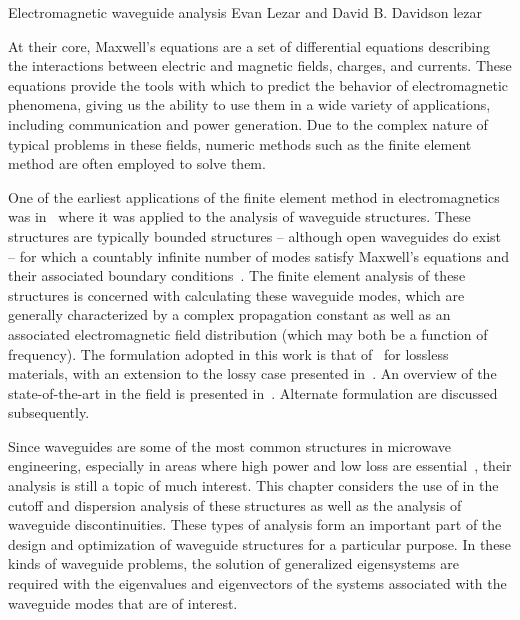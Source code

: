               {Electromagnetic waveguide analysis}
              {Evan Lezar and David B. Davidson}
              {lezar}


At their core, Maxwell's equations are a
set of differential equations describing the interactions between
electric and magnetic fields, charges, and currents. These equations
provide the tools with which to predict the behavior of
electromagnetic phenomena, giving us the
ability to use them in a wide variety of applications, including
communication and power generation. Due to the complex nature of
typical problems in these fields, numeric methods such as the finite
element method are often employed to solve them.

One of the earliest applications of the finite element method in
electromagnetics was in~\citet{Silvester1969} where it was applied to
the analysis of waveguide structures. These
structures are typically bounded structures -- although open
waveguides do exist -- for which a countably infinite number of modes
satisfy Maxwell's equations and their associated boundary
conditions~\citep{Pozar2005}. The finite element analysis of these
structures is concerned with calculating these waveguide modes, which
are generally characterized by a complex propagation constant as well
as an associated electromagnetic field distribution (which may both be
a function of frequency). The formulation adopted in this work is that
of~\citet{LeeSunCendes1991} for lossless materials, with an extension
to the lossy case presented in~\citet{Lee1994}. An overview of the
state-of-the-art in the field is presented
in~\citet{Davidson2011}. Alternate formulation are discussed
subsequently.

Since waveguides are some of the most common structures in microwave
engineering, especially in areas where high power and low loss are
essential~\citep{Pozar2005}, their analysis is still a topic of much
interest. This chapter considers the use of \fenics{} in the cutoff
and dispersion analysis of these structures as well as the analysis of
waveguide discontinuities. These types of analysis form an important
part of the design and optimization of waveguide structures for a
particular purpose. In these kinds of waveguide problems, the solution
of generalized eigensystems are required with the eigenvalues and
eigenvectors of the systems associated with the waveguide modes that
are of interest.

